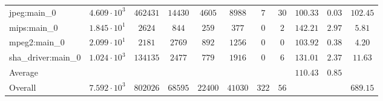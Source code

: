 \begin{tabular}{|l|c|c|c|c|c|c|c|c|c|c|}
jpeg:main\_0            & $ 4.609 \cdot 10^{3}  $ & $ 462431 $ & $ 14430 $ & $ 4605  $ & $ 8988  $ & $ 7   $ & $ 30 $ & $ 100.33      $ & $ 0.03    $ & $ 102.45  $ \\
mips:main\_0            & $ 1.845 \cdot 10^{1}  $ & $ 2624   $ & $ 844   $ & $ 259   $ & $ 377   $ & $ 0   $ & $ 2  $ & $ 142.21      $ & $ 2.97    $ & $ 5.81    $ \\
mpeg2:main\_0           & $ 2.099 \cdot 10^{1}  $ & $ 2181   $ & $ 2769  $ & $ 892   $ & $ 1256  $ & $ 0   $ & $ 0  $ & $ 103.92      $ & $ 0.38    $ & $ 4.20    $ \\
sha\_driver:main\_0     & $ 1.024 \cdot 10^{3}  $ & $ 134135 $ & $ 2477  $ & $ 779   $ & $ 1916  $ & $ 0   $ & $ 6  $ & $ 131.01      $ & $ 2.37    $ & $ 11.63   $ \\
\hline
Average                 & $                     $ & $        $ & $       $ & $       $ & $       $ & $     $ & $    $ & $ 110.43      $ & $ 0.85    $ & $         $ \\
\hline
Overall                 & $ 7.592 \cdot 10^{3}  $ & $ 802026 $ & $ 68595 $ & $ 22400 $ & $ 41030 $ & $ 322 $ & $ 56 $ & $             $ & $         $ & $ 689.15  $ \\
\hline
\end{tabular}
